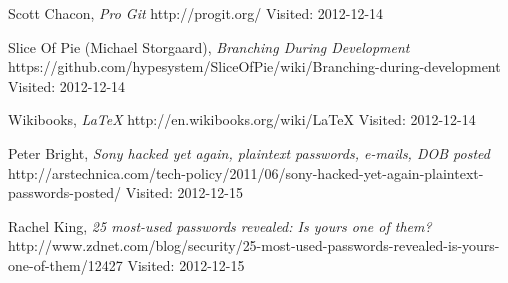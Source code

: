 \begin{thebibliography}{99}
        Scott Chacon,
        \emph{Pro Git}\newline
        http://progit.org/\newline
        Visited: 2012-12-14
        
        Slice Of Pie (Michael Storgaard),
        \emph{Branching During Development}\newline
        https://github.com/hypesystem/SliceOfPie/wiki/Branching-during-development\newline
        Visited: 2012-12-14
        
        Wikibooks,
        \emph{\LaTeX}\newline
        http://en.wikibooks.org/wiki/LaTeX\newline
        Visited: 2012-12-14
        
        Peter Bright,
        \emph{Sony hacked yet again, plaintext passwords, e-mails, DOB posted}\newline
        http://arstechnica.com/tech-policy/2011/06/sony-hacked-yet-again-plaintext-passwords-posted/\newline
        Visited: 2012-12-15
    
        Rachel King,
        \emph{25 most-used passwords revealed: Is yours one of them?}\newline
        http://www.zdnet.com/blog/security/25-most-used-passwords-revealed-is-yours-one-of-them/12427\newline
        Visited: 2012-12-15
\end{thebibliography}